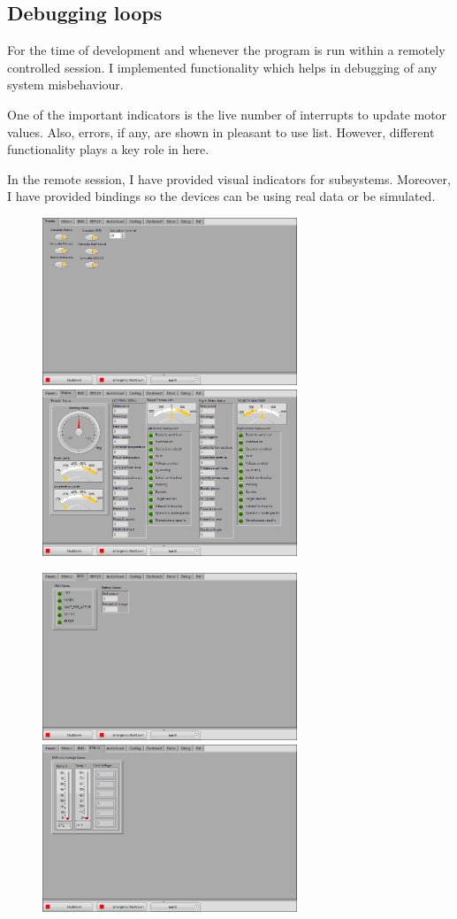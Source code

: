 \subsection{Debugging loops}
For the time of development and whenever the program is run within a remotely controlled session. I implemented functionality which helps in debugging of any system misbehaviour.

One of the important indicators is the live number of interrupts to update motor values. Also, errors, if any, are shown in pleasant to use list. However, different functionality plays a key role in here.

In the remote session, I have provided visual indicators for subsystems. Moreover, I have provided bindings so the devices can be using real data or be simulated.

\begin{figure}[h]
    \centering
        \includegraphics[height=5cm]{figures/Run_mainp0.png}
        \includegraphics[height=5cm]{figures/Run_mainp1.png}
\end{figure}
\begin{figure}[h]\ContinuedFloat
    \centering
        \includegraphics[height=5cm]{figures/Run_mainp2.png}
        \includegraphics[height=5cm]{figures/Run_mainp3.png}
\end{figure}

